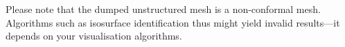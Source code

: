 \noindent
Please note that the dumped unstructured mesh is a non-conformal mesh. 
Algorithms such as isosurface identification thus might yield invalid
results---it depends on your visualisation algorithms.


% 
% 
% 
% 
% 
% 
% 
% 
% 
% 
% 
% 
% 
% 
% 
% 
% 
% 
% 
% 
% 
% 
% 
% 
% 
% 
% 
